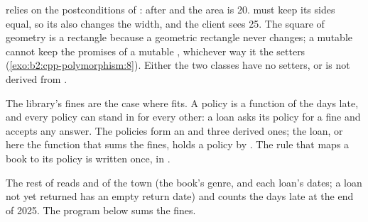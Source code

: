 \begin{example}\label{ex:b2:cpp-polymorphism:square}
\label{out:b2:cpp-polymorphism:square}
 relies on the postconditions of : after  and
 the area is 20.  must keep its sides equal, so its  also changes
the width, and the client sees 25. The square of geometry is a rectangle because a geometric rectangle never
changes; a mutable  cannot keep the promises of a mutable , whichever way it 
the setters (\cref{exo:b2:cpp-polymorphism:8}). Either the two classes have no setters, or  is not
derived from .
\end{example}

The library's fines are the case where  fits. A policy is a function of the days late, and every policy
can stand in for every other: a loan asks its policy for a fine and accepts any answer. The policies form an
 and three derived ones; the loan, or here the function that sums the fines, holds a policy by
. The rule that maps a book to its policy is written once, in .

\label{lst:b2:cpp-polymorphism:library}

The rest of  reads  and  of the town (the book's genre, and each
loan's dates; a loan not yet returned has an empty return date) and counts the days late at the end of 2025. The
program below sums the fines.

\label{lst:b2:cpp-polymorphism:library-demo}

\label{out:b2:cpp-polymorphism:library}

